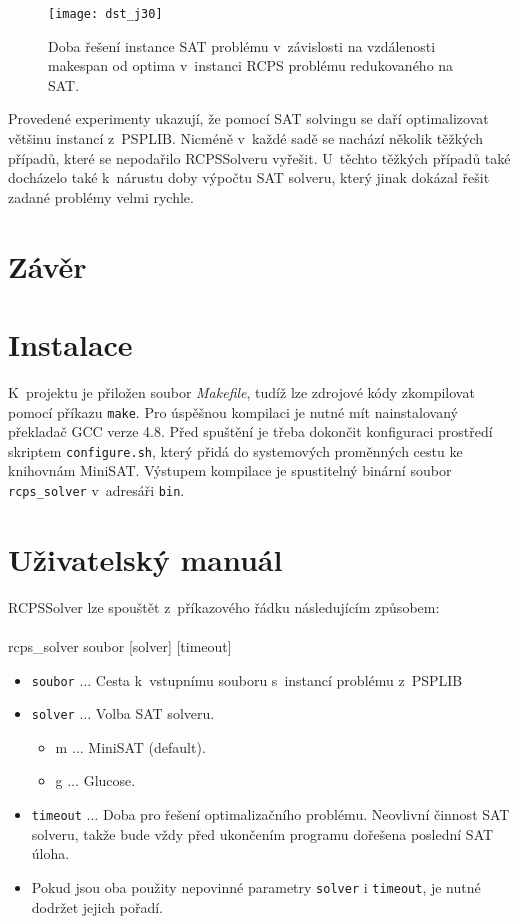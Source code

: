 \documentclass[a4paper, 12pt]{article}
\begin{document}
\begin{figure}[tb]
    \texttt{[image: dst\_j30]}
    \caption{Doba řešení instance SAT problému v~závislosti na vzdálenosti makespan od optima v~instanci RCPS problému redukovaného na SAT.}
    \label{pic:j30}
\end{figure}

Provedené experimenty ukazují, že pomocí SAT solvingu se daří optimalizovat většinu instancí z~PSPLIB.
Nicméně v~každé sadě se nachází několik těžkých případů, které se nepodařilo RCPSSolveru vyřešit.
U~těchto těžkých případů také docházelo také k~nárustu doby výpočtu SAT solveru, který jinak dokázal
řešit zadané problémy velmi rychle.

\section{Závěr}

\newpage
\appendix
\section{Instalace}
\label{app:install}
K~projektu je přiložen soubor \emph{Makefile}, tudíž lze zdrojové kódy zkompilovat pomocí příkazu \texttt{make}.
Pro úspěšnou kompilaci je nutné mít nainstalovaný překladač GCC verze 4.8.
Před spuštění je třeba dokončit konfiguraci prostředí skriptem \texttt{configure.sh},
který přidá do systemových proměnných cestu ke knihovnám MiniSAT.
Výstupem kompilace je spustitelný binární soubor \texttt{rcps\_solver} v~adresáři \texttt{bin}.
\section{Uživatelský manuál}
\label{app:help}
RCPSSolver lze spouštět z~příkazového řádku následujícím způsobem:
\\
\\
  rcps\_solver soubor [solver] [timeout]
  \begin{itemize}
    \item \texttt{soubor} $\ldots$ Cesta k~vstupnímu souboru s~instancí problému z~PSPLIB
    \item \texttt{solver} $\ldots$ Volba SAT solveru.  
    \begin{itemize}
        \item m $\ldots$ MiniSAT (default).
        \item g $\ldots$ Glucose.
    \end{itemize}
    \item \texttt{timeout} $\ldots$ Doba pro řešení optimalizačního problému.
    Neovlivní činnost SAT solveru, takže bude vždy před ukončením programu dořešena poslední SAT úloha.
    \item Pokud jsou oba použity nepovinné parametry \texttt{solver} i \texttt{timeout}, je nutné dodržet jejich pořadí.
  \end{itemize}
\end{document}
